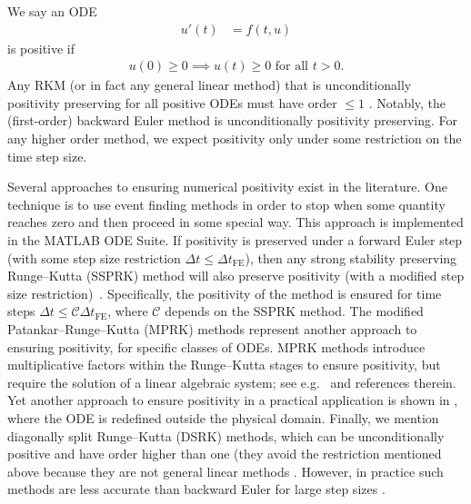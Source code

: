 \documentclass[a4paper]{article}
\numberwithin{equation}{section}
\theoremstyle{plain}
\theoremstyle{definition}
\numberwithin{theorem}{section}
\newcommand{\dt}{{\Delta t}}
\newcommand{\1}{\mathbbm{1}}
\begin{document}
We say an ODE
\begin{align} \label{ode}
    u'(t) & = f(t,u)
\end{align}
is positive if 
\begin{align} \label{continuous-positivity}
    u(0)\ge 0 \implies u(t) \ge 0 \text{ for all } t>0.
\end{align}
Any RKM (or in fact any general linear method) that is unconditionally positivity preserving for all positive ODEs
must have order $\le 1$ \cite{bolley_conservation_1978}. Notably, the (first-order)
backward Euler method is unconditionally positivity preserving.
For any higher order method, we expect positivity only under some restriction
on the time step size.

Several approaches to ensuring numerical positivity exist in the literature.
One technique is to use event finding methods in order to stop when some quantity
reaches zero and then proceed in some special way. This approach is implemented in the MATLAB ODE Suite.
If positivity is preserved under a forward Euler step (with
some step size restriction $\dt \le \dt_\text{FE}$), then any strong stability preserving Runge--Kutta (SSPRK)
method will also preserve positivity (with a modified step size restriction)~\cite{gottlieb_strong_2011}.
Specifically, the positivity of the method is ensured for time steps
$\dt \leq {\mathcal C} \dt_\text{FE}$, where ${\mathcal C}$ depends on the SSPRK method.
The modified Patankar--Runge--Kutta (MPRK) methods represent another approach to ensuring
positivity, for specific classes of ODEs.  MPRK methods introduce multiplicative
factors within the Runge--Kutta stages to ensure positivity, but require the solution
of a linear algebraic system; see e.g.\ \cite{kopecz_comparison_2019} and references therein.
Yet another approach to ensure positivity in a practical application is shown in \cite{shampine_non-negative_2005},
where the ODE is redefined outside the physical domain. 
Finally, we mention diagonally split Runge--Kutta (DSRK) methods, which can be unconditionally
positive and have order higher than one (they avoid the restriction mentioned above because
they are not general linear methods \cite{horvath_positivity_1998}.  However, in practice such
methods are less accurate than backward Euler for large step sizes \cite{macdonald2007}.
\end{document}
